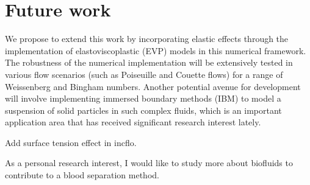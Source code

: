 \section{Future work}
We propose to extend this work by incorporating elastic effects through the implementation of elastoviscoplastic (EVP) models in this numerical framework. The robustness of the numerical implementation will be extensively tested in various flow scenarios (such as Poiseuille and Couette flows) for a range of Weissenberg and Bingham numbers.  Another potential avenue for development will involve implementing immersed boundary methods (IBM) to model a suspension of solid particles in such complex fluids, which is an important application area that has received significant research interest lately. 
\par
Add surface tension effect in incflo. 
\par 
As a personal research interest, I would like to study more about biofluids to contribute to a blood separation method. 